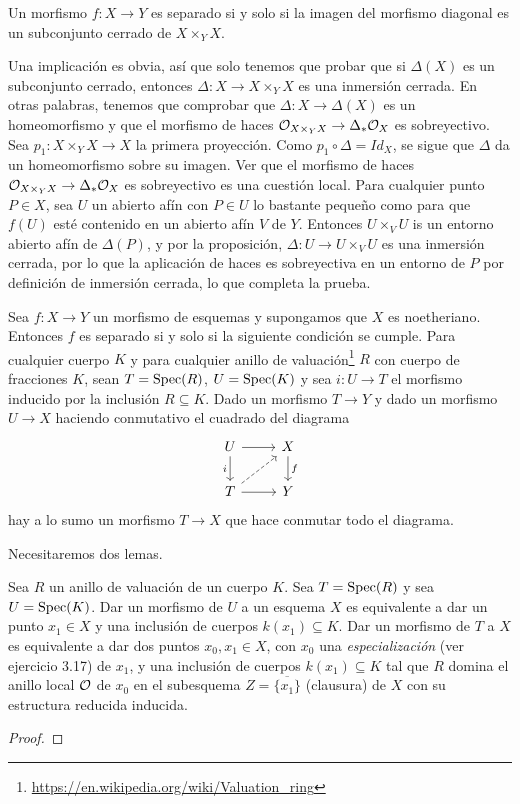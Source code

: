 \documentclass[GA.tex]{subfiles}
\begin{document}
\begin{coro}
Un morfismo $f:X\to Y$ es separado si y solo si la imagen del morfismo diagonal es un subconjunto cerrado de $X\times_Y X$.
\end{coro}
\begin{dem}
Una implicación es obvia, así que solo tenemos que probar que si $\Delta(X)$ es un subconjunto cerrado, entonces $\Delta:X\to X\times_Y X$ es una inmersión cerrada. En otras palabras, tenemos que comprobar que $\Delta:X\to \Delta(X)$ es un homeomorfismo y que el morfismo de haces ${\mathcal O}_{X\times_Y X}\to\Delta_*{\mathcal O}_X$ es sobreyectivo. Sea $p_1:X\times_Y X\to X$ la primera proyección. Como $p_1\circ\Delta=Id_X$, se sigue que $\Delta$ da un homeomorfismo sobre su imagen. Ver que el morfismo de haces ${\mathcal O}_{X\times_Y X}\to\Delta_*{\mathcal O}_X$ es sobreyectivo es una cuestión local. Para cualquier punto $P\in X$, sea $U$ un abierto afín con $P\in U$ lo bastante pequeño como para que $f(U)$ esté contenido en un abierto afín $V$ de $Y$. Entonces $U\times_V U$ is un entorno abierto afín de $\Delta(P)$, y por la proposición, $\Delta:U\to U\times_V U$ es una inmersión cerrada, por lo que la aplicación de haces es sobreyectiva en un entorno de $P$ por definición de inmersión cerrada, lo que completa la prueba.  
\end{dem}

\begin{teorema}
Sea $f:X\to Y$ un morfismo de esquemas y supongamos que $X$ es noetheriano. Entonces $f$ es separado si y solo si la siguiente condición se cumple. Para cualquier cuerpo $K$ y para cualquier anillo de valuación\footnote{\url{https://en.wikipedia.org/wiki/Valuation_ring}} $R$ con cuerpo de fracciones $K$, sean $T=\operatorname{Spec}(R)$, $U=\operatorname{Spec}(K)$ y sea $i:U\to T$ el morfismo inducido por la inclusión $R\subseteq K$. Dado un morfismo $T\to Y$ y dado un morfismo $U\to X$ haciendo conmutativo el cuadrado del diagrama
\[
\begin{tikzcd}
U\arrow[r]\arrow[d, "i"'] & X\arrow[d, "f"]\\
T\arrow[r]\arrow[ur, dashed] & Y
\end{tikzcd}
\]
hay a lo sumo un morfismo $T\to X$ que hace conmutar todo el diagrama. 
\end{teorema}

Necesitaremos dos lemas.

\begin{lemma}
Sea $R$ un anillo de valuación de un cuerpo $K$. Sea $T=\operatorname{Spec}(R)$ y sea $U=\operatorname{Spec}(K)$. Dar un morfismo de $U$ a un esquema $X$ es equivalente a dar un punto $x_1\in X$ y una inclusión de cuerpos $k(x_1)\subseteq K$. Dar un morfismo de $T$ a $X$ es equivalente a dar dos puntos $x_0,x_1\in X$, con $x_0$ una \emph{especialización } (ver ejercicio 3.17) de $x_1$, y una inclusión de cuerpos $k(x_1)\subseteq K$ tal que $R$ domina el anillo local ${\mathcal O}$ de $x_0$ en el subesquema $Z=\overline{\{x_1\}}$ (clausura) de $X$ con su estructura reducida inducida. 
\end{lemma}
\begin{proof}

\end{proof}
\end{document}
